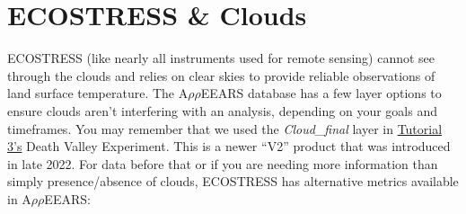 \documentclass[oneside,a4paper,11pt,explicit]{book}
\begin{document}
	\vspace{1 em}

	\section{ECOSTRESS \& Clouds}
	
	ECOSTRESS (like nearly all instruments used for remote sensing) cannot see through the clouds and relies on clear skies to provide reliable observations of land surface temperature. The A$\rho\rho$EEARS database has a few layer options to ensure clouds aren't interfering with an analysis, depending on your goals and timeframes. You may remember that we used the \textit{Cloud\_final} layer in  \href{https://jeremydforsythe.github.io/icecream-tutorials/Tutorial3_AccessingRemoteSensingDataWithAppears/Tutorial3_AccessingRemoteSensingDataWithAppears.pdf}{Tutorial 3's} Death Valley Experiment. This is a newer ``V2'' product that was introduced in late 2022. For data before that or if you are needing more information than simply presence/absence of clouds, ECOSTRESS has alternative metrics available in A$\rho\rho$EEARS:
	
\end{document}

